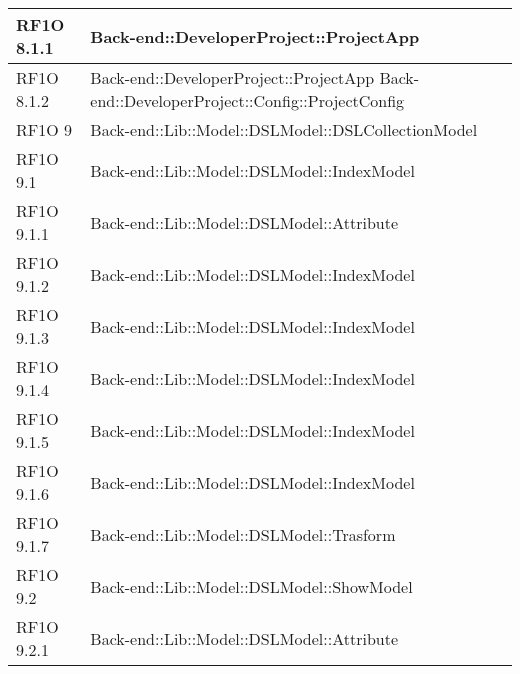 \begin{center}
\begin{longtable}{ | p{4cm} | p{10cm} | }
    RF1O 8.1.1 & Back-end::DeveloperProject::ProjectApp \newline  \\ \hline      
    RF1O 8.1.2 & Back-end::DeveloperProject::ProjectApp \newline Back-end::DeveloperProject::Config::ProjectConfig \newline  \\ \hline        
           
    RF1O 9 & Back-end::Lib::Model::DSLModel::DSLCollectionModel\newline  \\ \hline      
    
    RF1O 9.1 & Back-end::Lib::Model::DSLModel::IndexModel \newline  \\ \hline   
       
    RF1O 9.1.1 & Back-end::Lib::Model::DSLModel::Attribute \newline  \\ \hline      
    
    RF1O 9.1.2 & Back-end::Lib::Model::DSLModel::IndexModel \newline  \\ \hline      
    
    RF1O 9.1.3 &  Back-end::Lib::Model::DSLModel::IndexModel \newline  \\ \hline   
       
    RF1O 9.1.4 & Back-end::Lib::Model::DSLModel::IndexModel \newline  \\ \hline 
         
    RF1O 9.1.5 & Back-end::Lib::Model::DSLModel::IndexModel \newline  \\ \hline      
    
    RF1O 9.1.6 & Back-end::Lib::Model::DSLModel::IndexModel \newline  \\ \hline      
    
    RF1O 9.1.7 & Back-end::Lib::Model::DSLModel::Trasform \newline  \\ \hline
          
    RF1O 9.2 & Back-end::Lib::Model::DSLModel::ShowModel \newline  \\ \hline   
       
    RF1O 9.2.1 & Back-end::Lib::Model::DSLModel::Attribute \newline  \\ \hline      
    

\end{longtable}
\end{center}
